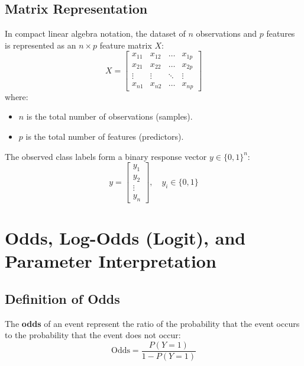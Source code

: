 \subsection{Matrix Representation}
In compact linear algebra notation, the dataset of $n$ observations and $p$ features is represented as an $n \times p$ feature matrix $X$:
\begin{equation}
X = \begin{bmatrix}
x_{11} & x_{12} & \dots & x_{1p} \\
x_{21} & x_{22} & \dots & x_{2p} \\
\vdots & \vdots & \ddots & \vdots \\
x_{n1} & x_{n2} & \dots & x_{np}
\end{bmatrix}
\end{equation}
where:
\begin{itemize}
    \item $n$ is the total number of observations (samples).
    \item $p$ is the total number of features (predictors).
\end{itemize}
The observed class labels form a binary response vector $y \in \{0, 1\}^n$:
\begin{equation}
y = \begin{bmatrix} y_1 \\ y_2 \\ \vdots \\ y_n \end{bmatrix}, \quad y_i \in \{0, 1\}
\end{equation}

\section{Odds, Log-Odds (Logit), and Parameter Interpretation}

\subsection{Definition of Odds}
The \textbf{odds} of an event represent the ratio of the probability that the event occurs to the probability that the event does not occur:
\begin{equation}
\text{Odds} = \frac{P(Y = 1)}{1 - P(Y = 1)}
\end{equation}

